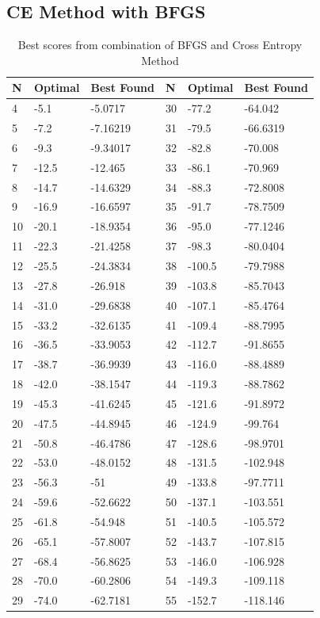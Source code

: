 \documentclass[conference,letterpaper]{IEEEtran}
\begin{document}
\subsection{CE Method with BFGS}
\begin{table}[!ht]
    \begin{tabularx}{\columnwidth}{XXXXXX}
    N  & Optimal & Best Found & N  & Optimal & Best Found \\ \hline
    4  & -5.1    & -5.0717    & 30 & -77.2   & -64.042    \\
    5  & -7.2    & -7.16219   & 31 & -79.5   & -66.6319   \\
    6  & -9.3    & -9.34017   & 32 & -82.8   & -70.008    \\
    7  & -12.5   & -12.465    & 33 & -86.1   & -70.969    \\
    8  & -14.7   & -14.6329   & 34 & -88.3   & -72.8008   \\
    9  & -16.9   & -16.6597   & 35 & -91.7   & -78.7509   \\
    10 & -20.1   & -18.9354   & 36 & -95.0   & -77.1246   \\
    11 & -22.3   & -21.4258   & 37 & -98.3   & -80.0404   \\
    12 & -25.5   & -24.3834   & 38 & -100.5  & -79.7988   \\
    13 & -27.8   & -26.918    & 39 & -103.8  & -85.7043   \\
    14 & -31.0   & -29.6838   & 40 & -107.1  & -85.4764   \\
    15 & -33.2   & -32.6135   & 41 & -109.4  & -88.7995   \\
    16 & -36.5   & -33.9053   & 42 & -112.7  & -91.8655   \\
    17 & -38.7   & -36.9939   & 43 & -116.0  & -88.4889   \\
    18 & -42.0   & -38.1547   & 44 & -119.3  & -88.7862   \\
    19 & -45.3   & -41.6245   & 45 & -121.6  & -91.8972   \\
    20 & -47.5   & -44.8945   & 46 & -124.9  & -99.764    \\
    21 & -50.8   & -46.4786   & 47 & -128.6  & -98.9701   \\
    22 & -53.0   & -48.0152   & 48 & -131.5  & -102.948   \\
    23 & -56.3   & -51        & 49 & -133.8  & -97.7711   \\
    24 & -59.6   & -52.6622   & 50 & -137.1  & -103.551   \\
    25 & -61.8   & -54.948    & 51 & -140.5  & -105.572   \\
    26 & -65.1   & -57.8007   & 52 & -143.7  & -107.815   \\
    27 & -68.4   & -56.8625   & 53 & -146.0  & -106.928   \\
    28 & -70.0   & -60.2806   & 54 & -149.3  & -109.118   \\
    29 & -74.0   & -62.7181   & 55 & -152.7  & -118.146   \\ \hline
    \end{tabularx}
    \caption{Best scores from combination of BFGS and Cross Entropy Method}
    \label{BFGSCE_RESULTS}
\end{table}
\end{document}
